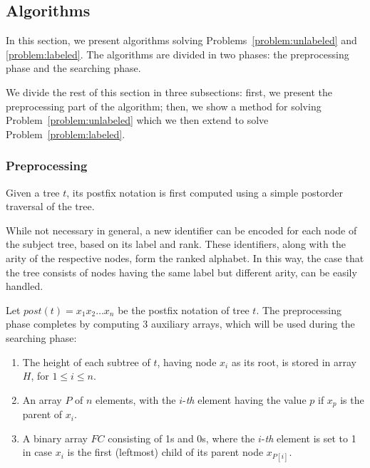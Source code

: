 \documentclass[preprint,12pt]{elsarticle}
\begin{document}
\subsection{Algorithms}
\label{Algo}
In this section, we present algorithms solving Problems~\ref{problem:unlabeled} and \ref{problem:labeled}. The algorithms are divided in two phases: the preprocessing phase and the searching phase.

We divide the rest of this section in three subsections: first, we present the preprocessing part of the algorithm; then, we show a method for solving Problem~\ref{problem:unlabeled} which we then extend to solve Problem~\ref{problem:labeled}.

\subsubsection{Preprocessing}

Given a tree $t$, its postfix notation is first computed using a simple postorder traversal of the tree.

While not necessary in general, a new identifier can be encoded for each node of the subject tree, based 
on its label and rank. These identifiers, along with the arity of the respective nodes, form the ranked 
alphabet. In this way, the case that the tree consists of nodes having the same label but different arity, can be easily handled.

Let $\textit{post}(t)=x_1 x_2 \ldots x_n$ be the postfix notation of tree $t$. The preprocessing phase
completes by computing 3 auxiliary arrays, which will be used during the searching phase:
\begin{enumerate}
\item The height of each subtree of $t$, having node $x_i$ as its root, is stored in array $H$, for $1 \leq i \leq n$. 
\item An array $P$ of $n$ elements, with the $i$-\textit{th} element having the value $p$ if $x_p$ is the parent of $x_i$.
\item A binary array $\textit{FC}$ consisting of 1s and 0s, where the $i$-\textit{th} element is set to 1 in case $x_i$  is the first (leftmost) child of its parent node $x_{P[i]}$.
\end{enumerate}

\end{document}
